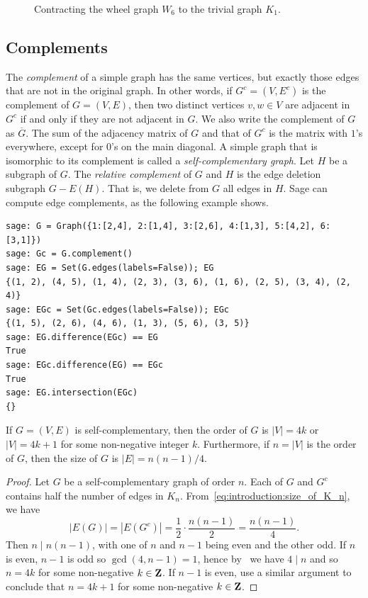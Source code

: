 \begin{figure}[!htbp]
\centering

\caption{Contracting the wheel graph $W_6$ to the trivial graph $K_1$.}
\label{fig:introduction:edge_contraction_W6_to_K1}
\end{figure}



\subsection{Complements}

The \emph{complement} of a simple graph has the same
vertices, but
exactly those edges that are not in the original graph. In other
words, if $G^c = (V, E^c)$ is the complement of
$G = (V,E)$, then two distinct vertices $v,w \in V$ are adjacent in
$G^c$ if and only if they are not adjacent in $G$. We also write the
complement of $G$ as $\overline{G}$. The sum of
the adjacency matrix of $G$ and that of $G^c$ is the matrix with $1$'s
everywhere, except for $0$'s on the main diagonal. A simple graph that
is isomorphic to its complement is called a
\emph{self-complementary graph}. Let
$H$ be a subgraph of $G$. The
\emph{relative complement} of $G$ and $H$
is the edge deletion subgraph $G - E(H)$. That is, we delete from $G$
all edges in $H$. Sage can compute edge complements, as the following
example shows.
%
\begin{lstlisting}
sage: G = Graph({1:[2,4], 2:[1,4], 3:[2,6], 4:[1,3], 5:[4,2], 6:[3,1]})
sage: Gc = G.complement()
sage: EG = Set(G.edges(labels=False)); EG
{(1, 2), (4, 5), (1, 4), (2, 3), (3, 6), (1, 6), (2, 5), (3, 4), (2, 4)}
sage: EGc = Set(Gc.edges(labels=False)); EGc
{(1, 5), (2, 6), (4, 6), (1, 3), (5, 6), (3, 5)}
sage: EG.difference(EGc) == EG
True
sage: EGc.difference(EG) == EGc
True
sage: EG.intersection(EGc)
{}
\end{lstlisting}

\begin{theorem}
If $G = (V, E)$ is self-complementary, then the order of $G$ is
$|V| = 4k$ or $|V| = 4k + 1$ for some non-negative integer
$k$. Furthermore, if $n = |V|$ is the order of $G$, then the size of
$G$ is $|E| = n(n - 1) / 4$.
\end{theorem}

\begin{proof}
Let $G$ be a self-complementary graph of order $n$. Each of $G$ and
$G^c$ contains half the number of edges in
$K_n$. From~\eqref{eq:introduction:size_of_K_n}, we have
\[
|E(G)|
=
|E(G^c)|
=
\frac{1}{2} \cdot \frac{n(n - 1)}{2}
=
\frac{n(n - 1)}{4}.
\]
Then $n \;|\; n(n - 1)$, with one of $n$ and $n - 1$ being even and
the other odd. If $n$ is even, $n - 1$ is odd so $\gcd(4, n-1) = 1$,
hence by~\cite[Theorem~1.9]{Shoup2008} we have $4 \;|\; n$ and so
$n = 4k$ for some non-negative $k \in \mathbf{Z}$. If $n - 1$ is even, use a
similar argument to conclude that $n = 4k + 1$ for some non-negative
$k \in \mathbf{Z}$.
\end{proof}

